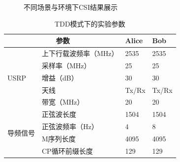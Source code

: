 \documentclass[master]{seuthesis} %
\begin{document}
\begin{Main}
\begin{figure}
{    }
    \quad
    \caption{不同场景与环境下CSI结果展示}{} %
    \label{tdd_csi_ab}
\end{figure}

\begin{table}[]
    \centering
    \begin{tabular}{|l|l|l|l|}
    \hline
    \multicolumn{2}{|c|}{参数} & Alice & Bob \\ \hline
    \multirow{5}{*}{USRP} & 上下行载波频率（MHz） & 2535 & 2535 \\ \cline{2-4} 
     & 采样率（MHz） & 25 & 25 \\ \cline{2-4} 
     & 增益（dB） & 30 & 30 \\ \cline{2-4} 
     & 天线 & Tx/Rx & Tx/Rx \\ \cline{2-4} 
     & 带宽（MHz） & 20 & 20 \\ \hline
    \multirow{4}{*}{导频信号} & 正弦波长度 & 1504 & 1504 \\ \cline{2-4} 
     & 正弦波频率（Hz） & 4 & 8 \\ \cline{2-4} 
     & M序列长度 & 4095 & 4095 \\ \cline{2-4} 
     & CP循环前缀长度 & 129 & 129 \\ \hline
    \end{tabular}
    \caption{TDD模式下的实验参数
    \label{tdd-exp-args}}
\end{table}


\end{Main}
\end{document}
